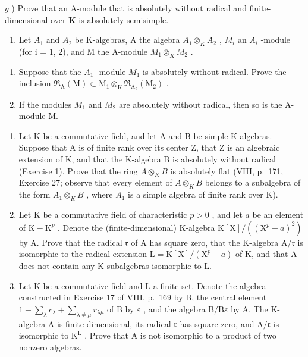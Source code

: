 \(g\) ) Prove that an A-module that is absolutely without radical and finite-dimensional over \(\mathbf{K}\) is absolutely semisimple.

\begin{enumerate}
\def\labelenumi{\arabic{enumi})}
\setcounter{enumi}{1}
\tightlist
\item
  Let \(A_{1}\) and \(A_{2}\) be K-algebras, A the algebra \(A_{1} \otimes_{K} A_{2}\) , \(M_{i}\) an \(A_{i}\) -module (for i = 1, 2), and M the A-module \(M_{1} \otimes_{K} M_{2}\) .
\end{enumerate}

\begin{enumerate}
\def\labelenumi{\alph{enumi})}
\item
  Suppose that the \(A_{1}\) -module \(M_{1}\) is absolutely without radical. Prove the inclusion \(\mathfrak{R}_{\mathrm{A}}(\mathrm{M}) \subset \mathrm{M}_{1} \otimes_{\mathrm{K}} \mathfrak{R}_{\mathrm{A}_{2}}(\mathrm{M}_{2})\) .
\item
  If the modules \(M_{1}\) and \(M_{2}\) are absolutely without radical, then so is the A-module M.
\end{enumerate}

\begin{enumerate}
\def\labelenumi{\arabic{enumi})}
\setcounter{enumi}{2}
\item
  Let K be a commutative field, and let A and B be simple K-algebras. Suppose that A is of finite rank over its center Z, that Z is an algebraic extension of K, and that the K-algebra B is absolutely without radical (Exercise 1). Prove that the ring \(A \otimes_{K} B\) is absolutely flat (VIII, p.~171, Exercise 27; observe that every element of \(A \otimes_{K} B\) belongs to a subalgebra of the form \(A_{1} \otimes_{K} B\) , where \(A_{1}\) is a simple algebra of finite rank over K).
\item
  Let \(\mathrm{K}\) be a commutative field of characteristic \(p > 0\) , and let \(a\) be an element of \(\mathrm{K} - \mathrm{K}^p\) . Denote the (finite-dimensional) K-algebra \(\mathrm{K}[\mathrm{X}] / ((\mathrm{X}^p - a)^2)\) by A. Prove that the radical \(\mathfrak{r}\) of A has square zero, that the K-algebra \(\mathrm{A} / \mathfrak{r}\) is isomorphic to the radical extension \(\mathrm{L} = \mathrm{K}[\mathrm{X}] / (\mathrm{X}^{p} - a)\) of K, and that A does not contain any K-subalgebras isomorphic to L.
\item
  Let \(\mathrm{K}\) be a commutative field and \(\mathrm{L}\) a finite set. Denote the algebra constructed in Exercise 17 of VIII, p.~169 by B, the central element \(1 - \sum_{\lambda} c_{\lambda} + \sum_{\lambda \neq \mu} r_{\lambda \mu}\) of \(\mathrm{B}\) by \(\varepsilon\) , and the algebra \(\mathrm{B} / \mathrm{B}\varepsilon\) by A. The K-algebra A is finite-dimensional, its radical \(\mathfrak{r}\) has square zero, and \(\mathrm{A} / \mathfrak{r}\) is isomorphic to \(\mathrm{K}^{\mathrm{L}}\) . Prove that A is not isomorphic to a product of two nonzero algebras.
\end{enumerate}

